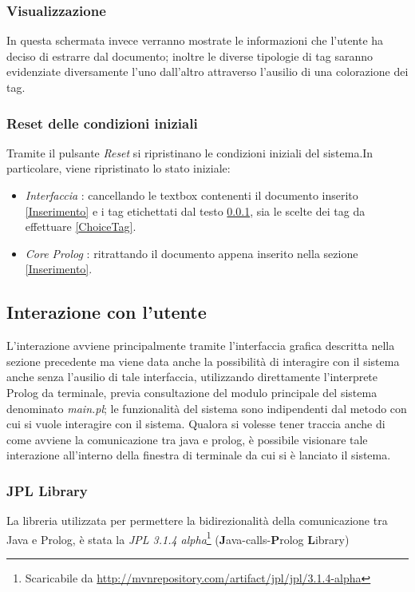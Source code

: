     \subsubsection{Visualizzazione}
    \label{Visualization}
    In questa schermata invece verranno mostrate le informazioni che l'utente ha deciso di estrarre dal documento; inoltre le diverse tipologie di tag saranno evidenziate diversamente l'uno dall'altro attraverso l'ausilio di una colorazione dei tag. 

    \subsubsection{Reset delle condizioni iniziali}
    Tramite il pulsante \emph{Reset} si ripristinano le condizioni iniziali del sistema.In particolare, viene ripristinato lo stato iniziale:
    \begin{itemize}
    	\item \emph{Interfaccia} : cancellando le textbox contenenti il documento inserito \ref{Inserimento} e i tag etichettati dal testo \ref{Visualization}, sia le scelte dei tag da effettuare \ref{ChoiceTag}.
    	\item \emph{Core Prolog} : ritrattando il documento appena inserito nella sezione \ref{Inserimento}.
    \end{itemize}
    
\subsection{Interazione con l’utente}
L’interazione avviene principalmente tramite l'interfaccia grafica descritta nella sezione precedente ma viene data anche la possibilità di interagire con il sistema anche senza l'ausilio di tale interfaccia, utilizzando direttamente l'interprete Prolog da terminale, previa consultazione del modulo principale del sistema denominato \emph{main.pl}; le funzionalità del sistema sono indipendenti dal metodo con cui si vuole interagire con il  sistema. Qualora si volesse tener traccia anche di come avviene la comunicazione tra java e prolog, è possibile visionare tale interazione all'interno della finestra di terminale da cui si è lanciato il sistema.

\subsubsection{JPL Library}
La libreria utilizzata per permettere la bidirezionalità della comunicazione tra Java e Prolog, è stata la \emph{JPL 3.1.4 alpha}\footnote{Scaricabile da \url{http://mvnrepository.com/artifact/jpl/jpl/3.1.4-alpha}} (\textbf{J}ava-calls-\textbf{P}rolog \textbf{L}ibrary)


